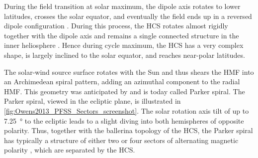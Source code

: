 During the field transition at solar maximum, the dipole axis rotates to lower latitudes, crosses the solar equator, and eventually the field ends up in a reversed dipole configuration \citep{Jones2003}. During this process, the HCS rotates almost rigidly together with the dipole axis and remains a single connected structure in the inner heliosphere \citep{Jones2003}. Hence during cycle maximum, the HCS has a very complex shape, is largely inclined to the solar equator, and reaches near-polar latitudes.

The solar-wind source surface rotates with the Sun and thus shears the HMF into an Archimedean spiral pattern, adding an azimuthal component to the radial HMF. This geometry was anticipated by \citet{Parker1958} and is today called Parker spiral. The Parker spiral, viewed in the ecliptic plane, is illustrated in \autoref{fig:Owens2013_PFSS_Sectors_screenshot}. The solar rotation axis tilt of up to \SI{7.25}{\degree} to the ecliptic leads to a slight diving into both hemispheres of opposite polarity. Thus, together with the ballerina topology of the HCS, the Parker spiral has typically a structure of either two or four sectors of alternating magnetic polarity \citep{Ness1965}, which are separated by the HCS.
\begin{figure}[htb]
\end{figure}

